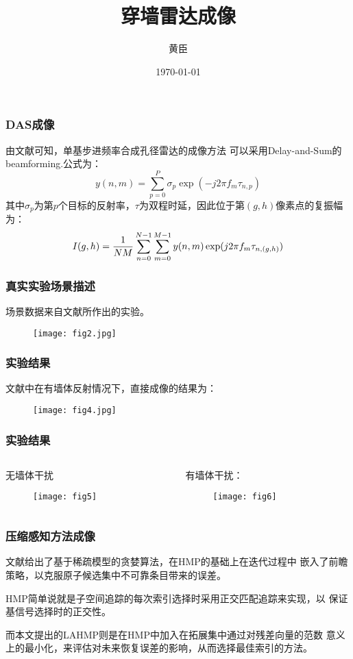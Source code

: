 \documentclass[12pt]{beamer}
\begin{document}
 
\title{穿墙雷达成像}  
\author{黄臣}  
\date{\today}  
\frame{\titlepage}  
\begin{frame}
  \frametitle{DAS成像}
  由文献\citep{Tang2016Radar}\citep{Tivive2011An}可知，单基步进频率合成孔径雷达的成像方法
  可以采用Delay-and-Sum的beamforming.公式为：
  \begin{equation}
	y(n, m)=\sum_{p=0}^{P}\sigma_{p}\exp(-j2\pi f_{m}\tau_{n,p})
  \end{equation}
  其中$\sigma_{p}$为第$p$个目标的反射率，$\tau$为双程时延，因此位于第$(g,h)$像素点的复振幅为：
  \begin{equation}
	I(g, h)={1\over NM}\sum_{n=0}^{N-1}\sum_{m=0}^{M-1}y(n, m)\exp(j2\pi f_{m}\tau_{n,(g,h)})
  \end{equation}
\end{frame}
\begin{frame}
  \frametitle{真实实验场景描述}
  场景数据来自文献\citep{Dilsavor2005Experiments}所作出的实验。
  \begin{figure}
  \centering
  \texttt{[image: fig2.jpg]}
  \end{figure}
\end{frame}
\begin{frame}
  \frametitle{实验结果}
  文献\citep{Tivive2011An}中在有墙体反射情况下，直接成像的结果为：
  \begin{figure}
  \centering
  \texttt{[image: fig4.jpg]}
  \end{figure}
\end{frame}
\begin{frame}
  \frametitle{实验结果}
  \begin{columns}
  \footnotesize
	\begin{column}{0.5\textwidth}
	  无墙体干扰
  \begin{figure}
  \centering
  \texttt{[image: fig5]}
  \end{figure}
\end{column}
	\begin{column}{0.5\textwidth}
	  有墙体干扰：
  \begin{figure}
  \centering
  \texttt{[image: fig6]}
  \end{figure}
\end{column}
\end{columns}
\end{frame}
\begin{frame}
  \frametitle{压缩感知方法成像}
  文献\citep{Wang2017Look}给出了基于稀疏模型的贪婪算法，在HMP的基础上在迭代过程中
  嵌入了前瞻策略，以克服原子候选集中不可靠条目带来的误差。
  \par HMP简单说就是子空间追踪的每次索引选择时采用正交匹配追踪来实现，以
  保证基信号选择时的正交性。
  \par 而本文提出的LAHMP则是在HMP中加入在拓展集中通过对残差向量的范数
  意义上的最小化，来评估对未来恢复误差的影响，从而选择最佳索引的方法。
\end{frame}
\end{document}
